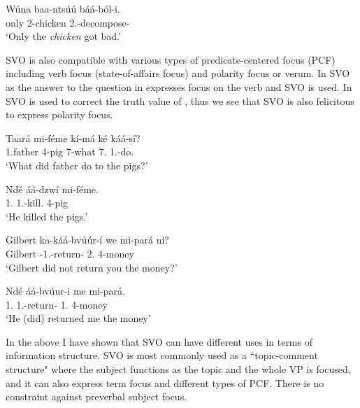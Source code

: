 \documentclass[output=paper,colorlinks,citecolor=brown,
]{langscibook}
\begin{document}
\begin{exe}
\ex
\label{11}
\gll
Wúna	baa-ntsúú	báá-ból-i.\\
only	2-chicken	2\Sm{}.\Pst{}-decompose-\Pst{}\\
\trans ‘Only the \textit{chicken} got bad.’

\end{exe}
SVO is also compatible with various types of predicate-centered focus (PCF) \citep{Güldemann2003, Güldemann2009} including verb focus (state-of-affairs focus) and polarity focus or verum. In  SVO as the answer to the question in  expresses focus on the verb and SVO is used. In  SVO is used to correct the truth value of , thus we see that SVO is also felicitous to express polarity focus.
 \begin{exe}
    \ex \label{12}
    \begin{xlist}
\ex
\label{12a}
\gll
Taará mi-féme kí-má ké káá-sí?\\
1.father 4-pig 7-what 7.\Pro{} 1\Sm{}.\Pst{}-do.\Pst{}\\
\trans ‘What did father do to the pigs?’

\ex
\label{12b}
\gll
Ndé áá-dzw\'{i} mi-f\'{e}me.\\
1.\Pro{} 1\Sm{}.\Pst{}-kill.\Pst{} 4-pig\\
\trans ‘He killed the pigs.’

    \end{xlist}
\end{exe}
\begin{exe}
     \ex \label{13}
    \begin{xlist}
\ex
\label{13a}
\gll
Gilbert ka-káá-bvúúr-í we mi-pará ni?\\
Gilbert \Neg{}-1\Sm{}.\Pst{}-return-\Pst{} 2\Sg{}.\Pro{} 4-money \Neg{}\\
\trans ‘Gilbert did not return you the money?’

\ex
\label{13b}
\gll
Ndé áá-bvúur-i me mi-pará.\\
1.\Pro{} 1\Sm{}.\Pst{}-return-\Pst{} 1\Sg{}.\Pro{} 4-money\\
\trans ‘He (did) returned me the money’

    \end{xlist}
\end{exe}
In the above I have shown that SVO can have different uses in terms of information structure. SVO is most commonly used as a ``topic-comment structure" where the subject functions as the topic and the whole VP is focused, and it can also express term focus and different types of PCF. There is no constraint against preverbal subject focus.
\end{document}
